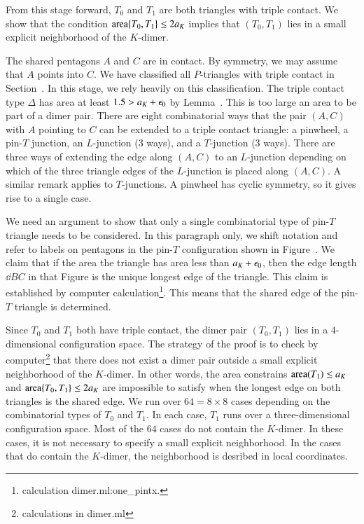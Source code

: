 From this stage forward, $T_0$ and $T_1$ are both triangles with triple contact.
We show that the condition ${\operatorname{area}}\{T_0,T_1\}\le 2a_K$ implies that
$(T_0,T_1)$ lies in a small explicit neighborhood of the $K$-dimer.

The shared pentagons $A$ and $C$ are in contact.  By symmetry, we may assume that $A$ points into $C$.
We have classified all $P$-triangles with triple contact in Section~.  In this stage, we rely heavily
on this classification.   The triple contact type $\Delta$ has area at least $1.5 > a_K+\epsilon_0$ by Lemma~.
This is too large an area to be part of a dimer pair.   There are eight combinatorial ways that the pair $(A,C)$ with $A$ pointing
to $C$ can be extended to a  triple contact triangle: a pinwheel, a pin-$T$ junction, an $L$-junction (3 ways), and a $T$-junction (3 ways).
There are three ways of extending the edge along $(A,C)$ to an $L$-junction depending on which of the three triangle edges of the $L$-junction
is placed along $(A,C)$.  A similar remark applies to $T$-junctions.  A pinwheel has cyclic symmetry, so it gives rise to a single case.

We need an argument to show that only a single combinatorial type of pin-$T$ triangle needs to be considered.  
In this paragraph only, we shift notation and refer
to labels on pentagons in the pin-$T$ configuration shown in Figure~.  We claim that if the area the triangle has area less than
$a_K+\epsilon_0$, then the edge length $\dd{B}{C}$ in that Figure is the unique longest edge of the triangle.   
This claim is established by computer calculation\footnote{calculation dimer.ml:one\_pintx.}.  
This means that the shared edge of the pin-$T$ triangle is determined.

Since $T_0$ and $T_1$ both have triple contact, the dimer pair $(T_0,T_1)$ lies in a $4$-dimensional configuration space.
The strategy of the proof is to check by computer\footnote{calculations in dimer.ml} 
that there does not exist a  dimer pair outside a small explicit neighborhood
of the $K$-dimer.  In other words, the area constrains ${\operatorname{area}}(T_1)\le a_K$ and ${\operatorname{area}}\{T_0,T_1\}\le2a_K$ are
impossible to satisfy when the longest edge on both triangles is the shared edge.  
We run over $64 = 8\times 8$ cases depending on the combinatorial types of $T_0$ and $T_1$.  In each case,
$T_1$ runs over a three-dimensional configuration space.  Most of the $64$ cases do not contain the $K$-dimer.
In these cases, it is not necessary to specify a small explicit neighborhood.  In the cases that do contain the $K$-dimer,
the neighborhood is desribed in local coordinates.

